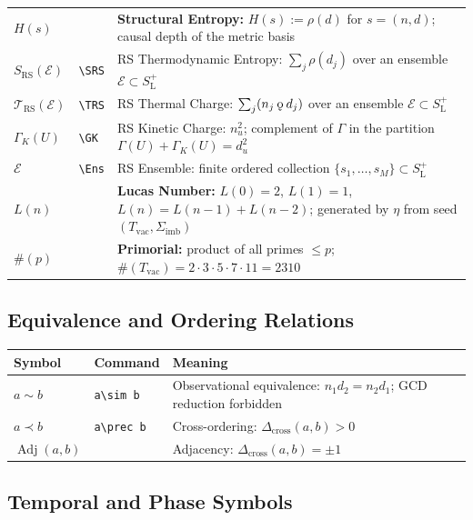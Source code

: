 \documentclass[11pt, letterpaper]{article}
\newcommand{\SLpos}{S_{\mathrm{L}}^{+}}
\newcommand{\GK}{\Gamma_{K}}
\newcommand{\SRS}{S_{\mathrm{RS}}}
\newcommand{\TRS}{\mathcal{T}_{\mathrm{RS}}}
\newcommand{\Ens}{\mathcal{E}}
\newcommand{\aop}{\eta}
\newcommand{\rank}{\rho}
\newcommand{\Dcross}{\Delta_{\mathrm{cross}}}
\newcommand{\koppa}{\mathbin{\text{\rm\k{o}}}}
\newcommand{\Tcharge}{\Gamma}
\newcommand{\Sigimb}{\Sigma_{\mathrm{imb}}}
\theoremstyle{definition}
\theoremstyle{plain}
\begin{document}
\begin{longtable}{L{2.2cm} L{2.6cm} L{8.5cm}}
$H(s)$ & & \textbf{Structural Entropy:}
  $H(s):=\rank(d)$ for $s=(n,d)$; causal depth of the metric basis \\[3pt]
  
  $\SRS(\Ens)$ & \verb|\SRS| & RS Thermodynamic Entropy:
  $\sum_{j}\rank(d_j)$ over an ensemble $\Ens\subset\SLpos$ \\[3pt]
$\TRS(\Ens)$ & \verb|\TRS| & RS Thermal Charge:
  $\sum_{j}(n_j\koppa d_j)$ over an ensemble $\Ens\subset\SLpos$ \\[3pt]
$\GK(U)$ & \verb|\GK| & RS Kinetic Charge:
  $n_u^2$; complement of $\Tcharge$ in the partition
  $\Tcharge(U)+\GK(U)=d_u^2$ \\[3pt]
$\Ens$ & \verb|\Ens| & RS Ensemble: finite ordered collection
  $\{s_1,\ldots,s_M\}\subset\SLpos$ \\[3pt]

$L(n)$ & & \textbf{Lucas Number:}
  $L(0)=2$, $L(1)=1$, $L(n)=L(n-1)+L(n-2)$;
  generated by $\aop$ from seed $(T_{\mathrm{vac}},\Sigimb)$ \\[3pt]

$\#(p)$ & & \textbf{Primorial:}
  product of all primes $\leq p$;
  $\#(T_{\mathrm{vac}})=2\cdot3\cdot5\cdot7\cdot11=2310$ \\[3pt]
\end{longtable}

\subsection{Equivalence and Ordering Relations}

\begin{longtable}{L{2.2cm} L{2.6cm} L{8.5cm}}
\toprule
\textbf{Symbol} & \textbf{Command} & \textbf{Meaning} \\
\midrule\endhead\bottomrule\endfoot

$a\sim b$ & \verb|a\sim b| & Observational equivalence:
  $n_1 d_2=n_2 d_1$; GCD reduction forbidden \\[3pt]
$a\prec b$ & \verb|a\prec b| & Cross-ordering: $\Dcross(a,b)>0$ \\[3pt]
$\operatorname{Adj}(a,b)$ & & Adjacency: $\Dcross(a,b)=\pm 1$ \\[3pt]
\end{longtable}

\subsection{Temporal and Phase Symbols}
\end{document}

